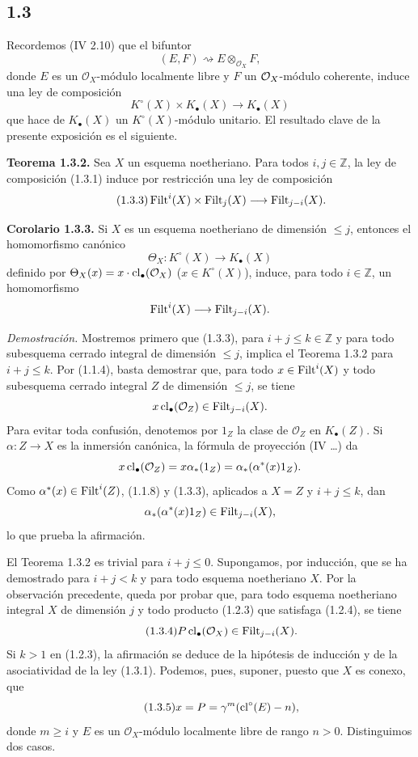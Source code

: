\subsection*{1.3}
Recordemos (IV 2.10) que el bifuntor
\[
(E,F)\rightsquigarrow E\otimes_{\mathcal O_X}F,
\]
donde $E$ es un $\mathcal O_X$-módulo localmente libre y $F$ un
$\sisi{\mathcal C_X}{\mathcal O_X}$-módulo coherente, induce una ley de composición
\begin{equation}\tag{1.3.1}
K^\circ(X)\times K_\bullet(X)\longrightarrow K_\bullet(X)
\end{equation}
que hace de $K_\bullet(X)$ un $K^\circ(X)$-módulo unitario. El resultado clave
de la presente exposición es el siguiente.

\textbf{Teorema 1.3.2.}
Sea $X$ un esquema noetheriano. Para todos $i,j\in\mathbb Z$, la ley de
composición (1.3.1) induce por restricción una ley de composición
\begin{equation}\tag{1.3.3}
\Filt^i(X)\times\Filt_j(X)\longrightarrow\Filt_{j-i}(X).
\end{equation}

\textbf{Corolario 1.3.3.}
Si $X$ es un esquema noetheriano de dimensión $\leq j$, entonces el
homomorfismo canónico
\[
\Theta_X:K^\circ(X)\longrightarrow K_\bullet(X)
\]
definido por $\Theta_X(x)=x\cdot\cl_\bullet(\mathcal O_X)$
($x\in K^\circ(X)$), induce, para todo $i\in\mathbb Z$, un homomorfismo
\[
\Filt^i(X)\longrightarrow\Filt_{j-i}(X).
\]

\emph{Demostración.}
Mostremos primero que (1.3.3), para $i+j\leq k\in\mathbb Z$ y para todo
subesquema cerrado integral de dimensión $\leq j$, implica el Teorema
1.3.2 para $i+j\leq k$. Por (1.1.4), basta demostrar que, para todo
$x\in\Filt^i(X)$ y todo subesquema cerrado integral $Z$ de dimensión $\leq j$,
se tiene
\[
x\cl_\bullet(\mathcal O_Z)\in\Filt_{j-i}(X).
\]
Para evitar toda confusión, denotemos por $1_Z$ la clase de $\mathcal O_Z$ en
$K_\bullet(Z)$. Si $\alpha:Z\to X$ es la inmersión canónica, la fórmula de
proyección (IV \ldots) da
\[
x\cl_\bullet(\mathcal O_Z)
=x\alpha_*(1_Z)
=\alpha_*(\alpha^*(x)1_Z).
\]
Como $\alpha^*(x)\in\Filt^i(Z)$, (1.1.8) y (1.3.3), aplicados a $X=Z$ y
$i+j\leq k$, dan
\[
\alpha_*(\alpha^*(x)1_Z)\in\Filt_{j-i}(X),
\]
lo que prueba la afirmación.

El Teorema 1.3.2 es trivial para $i+j\leq0$. Supongamos, por inducción, que se
ha demostrado para $i+j<k$ y para todo esquema noetheriano $X$. Por la
observación precedente, queda por probar que, para todo esquema noetheriano
integral $X$ de dimensión $j$ y todo producto (1.2.3) que satisfaga (1.2.4),
se tiene
\begin{equation}\tag{1.3.4}
P\cl_\bullet(\mathcal O_X)\in\Filt_{j-i}(X).
\end{equation}
Si $k>1$ en (1.2.3), la afirmación se deduce de la hipótesis de inducción y de
la asociatividad de la ley (1.3.1). Podemos, pues, suponer, puesto que $X$ es
conexo, que
\begin{equation}\tag{1.3.5}
x=P=\gamma^m(\cl^\circ(E)-n),
\end{equation}
donde $m\geq i$ y $E$ es un $\mathcal O_X$-módulo localmente libre de rango
$n>0$. Distinguimos dos casos.

